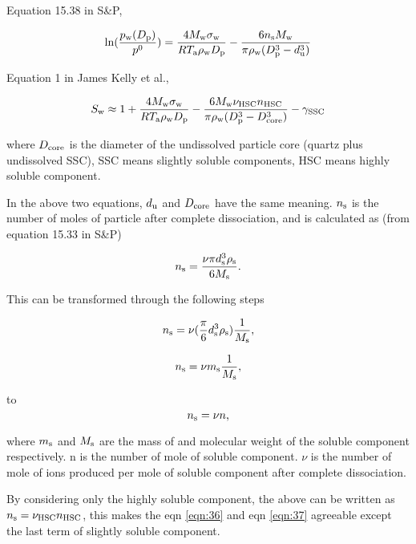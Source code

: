 \documentclass[12pt]{article}
\begin{document}
Equation 15.38 in S\&P, 

\begin{equation}\label{eqn:36}
\ln(\frac{p_{\rm w}(D_{\rm p})}{p^{\rm 0}})=\frac{4M_{\rm w}\sigma_{\rm w}}{RT_{\rm a}\rho_{\rm w} D_{\rm p}}-\frac{6n_{\rm s}M_{\rm w}}{\pi\rho_{\rm w}(D_{\rm p}^{3}-d_{\rm u}^{3})}
\end{equation}

Equation 1 in James Kelly et al., 

\begin{equation}\label{eqn:37}
S_{\rm w}\approx 1+\frac{4M_{\rm w}\sigma_{\rm w}}{RT_{\rm a}\rho_{\rm w}D_{\rm p}}-\frac{6M_{\rm w}\nu_{\rm HSC}n_{\rm HSC}}{\pi \rho_{\rm w}(D_{\rm p}^{3}-D_{\rm core}^{3})}-\gamma_{\rm SSC}
\end{equation}

where $D_{\rm core}$ is the diameter of the undissolved particle core (quartz plus undissolved SSC), SSC means slightly soluble components, HSC means highly soluble component.

In the above two equations, $d_{\rm u}$ and $D_{\rm core}$ have the same meaning.  $n_{\rm s}$ is the number of moles of particle after complete dissociation, and is calculated as (from equation 15.33 in S\&P) 

\begin{equation}\label{eqn:38}
n_{\rm s}=\frac{\nu \pi d_{\rm s}^{3} \rho_{\rm s}}{6 M_{\rm s}}.
\end{equation}

This can be transformed through the following steps

\begin{equation}\label{eqn:39}
n_{\rm s}=\nu (\frac{\pi}{6}d_{\rm s}^{3} \rho_{\rm s} ) \frac{1}{M_{\rm s}},
\end{equation}


\begin{equation}\label{eqn:40}
n_{\rm s}=\nu m_{\rm s}  \frac{1}{M_{\rm s}},
\end{equation}

to 
\begin{equation}\label{eqn:41}
n_{\rm s}=\nu n,
\end{equation}

where $m_{\rm s}$ and $M_{\rm s}$ are the mass of and molecular weight of the soluble component respectively. n is the number of mole of soluble component. $\nu$ is the number of mole of ions produced per mole of soluble component after complete dissociation.

By considering only the highly soluble component, the above can be written as $n_{\rm s}=\nu_{\rm HSC} n_{\rm HSC}$, this makes the eqn \ref{eqn:36} and eqn \ref{eqn:37} agreeable except the last term of slightly soluble component. 
\end{document}
